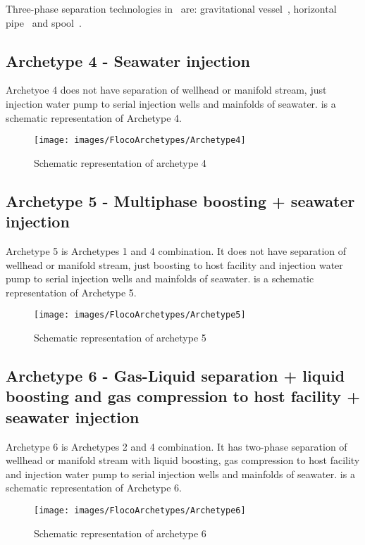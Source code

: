 Three-phase separation technologies in \Floco~are: gravitational vessel~\citep{Davies2010}, horizontal pipe~\citep{Sagatun2008} and spool~\citep{Shaiek2015}.

\subsection{Archetype 4 - Seawater injection}
Archetyoe 4 does not have separation of wellhead or manifold stream, just injection water pump to serial injection wells and mainfolds of seawater.  is a schematic representation of Archetype 4.
\begin{figure}[H]
\centering
\texttt{[image: images/FlocoArchetypes/Archetype4]}
\caption{Schematic representation of archetype 4}
\label{fig:Archetype4}
\end{figure}

\subsection{Archetype 5 - Multiphase boosting + seawater injection}
Archetype 5 is Archetypes 1 and 4 combination. It does not have separation of wellhead or manifold stream, just boosting to host facility and injection water pump to serial injection wells and mainfolds of seawater.  is a schematic representation of Archetype 5.
\begin{figure}[H]
\centering
\texttt{[image: images/FlocoArchetypes/Archetype5]}
\caption{Schematic representation of archetype 5}
\label{fig:Archetype5}
\end{figure}

\subsection{Archetype 6 - Gas-Liquid separation + liquid boosting and gas compression to host facility + seawater injection}
Archetype 6 is Archetypes 2 and 4 combination. It has two-phase separation of wellhead or manifold stream with liquid boosting, gas compression to host facility and injection water pump to serial injection wells and mainfolds of seawater.
 is a schematic representation of Archetype 6.
\begin{figure}[H]
\centering
\texttt{[image: images/FlocoArchetypes/Archetype6]}
\caption{Schematic representation of archetype 6}
\label{fig:Archetype6}
\end{figure}

